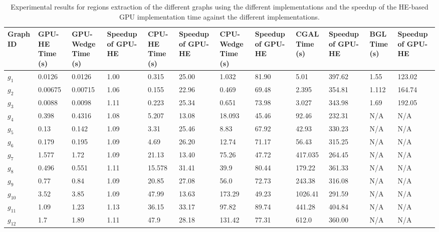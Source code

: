 \begin{table}
\centering
\small %
\begin{tabularx}{\textwidth}{|X|>{\columncolor[gray]{0.9}}X|X|X|>{\columncolor[gray]{0.9}}X|X|X|X|X|X|X|X|}
\hline
Graph ID & GPU-HE Time (s) & GPU-Wedge Time (s) & Speedup of GPU-HE & CPU-HE Time (s) & Speedup of GPU-HE & CPU-Wedge Time (s) & Speedup of GPU-HE & CGAL Time (s) & Speedup of GPU-HE & BGL Time (s) & Speedup of GPU-HE \\
\hline
\(g_1\) & 0.0126 & 0.0126 & 1.00 & 0.315 & 25.00 & 1.032 & 81.90 & 5.01 & 397.62 & 1.55 & 123.02 \\
\hline
\(g_2\) & 0.00675 & 0.00715 & 1.06 & 0.155 & 22.96 & 0.469 & 69.48 & 2.395 & 354.81 & 1.112 & 164.74 \\
\hline
\(g_3\) & 0.0088 & 0.0098 & 1.11 & 0.223 & 25.34 & 0.651 & 73.98 & 3.027 & 343.98 & 1.69 & 192.05 \\
\hline
\(g_4\) & 0.398 & 0.4316 & 1.08 & 5.207 & 13.08 & 18.093 & 45.46 & 92.46 & 232.31 & N/A & N/A \\
\hline
\(g_5\) & 0.13 & 0.142 & 1.09 & 3.31 & 25.46 & 8.83 & 67.92 & 42.93 & 330.23 & N/A & N/A \\
\hline
\(g_6\) & 0.179 & 0.195 & 1.09 & 4.69 & 26.20 & 12.74 & 71.17 & 56.43 & 315.25 & N/A & N/A \\
\hline
\(g_7\) & 1.577 & 1.72 & 1.09 & 21.13 & 13.40 & 75.26 & 47.72 & 417.035 & 264.45 & N/A & N/A \\
\hline
\(g_8\) & 0.496 & 0.551 & 1.11 & 15.578 & 31.41 & 39.9 & 80.44 & 179.22 & 361.33 & N/A & N/A \\
\hline
\(g_9\) & 0.77 & 0.84 & 1.09 & 20.85 & 27.08 & 56.0 & 72.73 & 243.38 & 316.08 & N/A & N/A \\
\hline
\(g_{10}\) & 3.52 & 3.85 & 1.09 & 47.99 & 13.63 & 173.29 & 49.23 & 1026.41 & 291.59 & N/A & N/A \\
\hline
\(g_{11}\) & 1.09 & 1.23 & 1.13 & 36.15 & 33.17 & 97.82 & 89.74 & 441.28 & 404.84 & N/A & N/A \\
\hline
\(g_{12}\) & 1.7 & 1.89 & 1.11 & 47.9 & 28.18 & 131.42 & 77.31 & 612.0 & 360.00 & N/A & N/A \\
\hline
\end{tabularx}
\caption{Experimental results for regions extraction of the different graphs using the different implementations and the speedup of the HE-based GPU implementation time against the different implementations.}
\label{tab:results}
\end{table}

